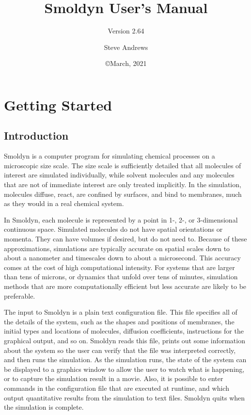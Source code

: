\documentclass {scrbook}
\begin{document}


\title{Smoldyn User's Manual}
\subtitle{Version 2.64}
\date{\copyright March, 2021}
\author{Steve Andrews}
\maketitle

\tableofcontents


\part{Getting Started}

\chapter{Introduction}

Smoldyn is a computer program for simulating chemical processes on a microscopic size scale. The size scale is sufficiently detailed that all molecules of interest are simulated individually, while solvent molecules and any molecules that are not of immediate interest are only treated implicitly. In the simulation, molecules diffuse, react, are confined by surfaces, and bind to membranes, much as they would in a real chemical system.

In Smoldyn, each molecule is represented by a point in 1-, 2-, or 3-dimensional continuous space. Simulated molecules do not have spatial orientations or momenta. They can have volumes if desired, but do not need to. Because of these approximations, simulations are typically accurate on spatial scales down to about a nanometer and timescales down to about a microsecond. This accuracy comes at the cost of high computational intensity. For systems that are larger than tens of microns, or dynamics that unfold over tens of minutes, simulation methods that are more computationally efficient but less accurate are likely to be preferable.

The input to Smoldyn is a plain text configuration file. This file specifies all of the details of the system, such as the shapes and positions of membranes, the initial types and locations of molecules, diffusion coefficients, instructions for the graphical output, and so on. Smoldyn reads this file, prints out some information about the system so the user can verify that the file was interpreted correctly, and then runs the simulation. As the simulation runs, the state of the system can be displayed to a graphics window to allow the user to watch what is happening, or to capture the simulation result in a movie. Also, it is possible to enter commands in the configuration file that are executed at runtime, and which output quantitative results from the simulation to text files. Smoldyn quits when the simulation is complete.
\end{document}
